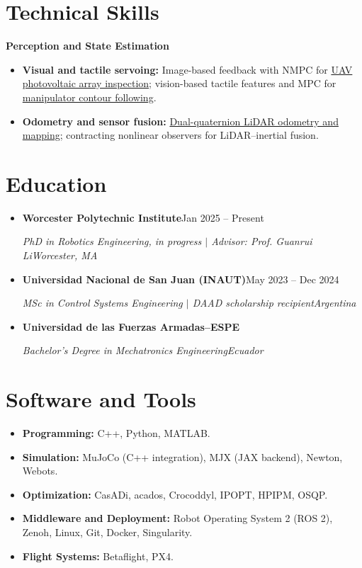 \documentclass[letterpaper,11pt]{article}
\newcommand{\resumeSubheading}[4]{
  \vspace{-2pt}\item
    \textbf{#1}\enspace\textbar\enspace #2\\
    {\small\textit{#3\enspace\textbar\enspace #4}\par}\vspace{-5pt}
}
\newcommand{\resumeSubHeadingListStart}{\begin{itemize}[leftmargin=0.15in, label={}, topsep=3pt]}
\newcommand{\resumeSubHeadingListEnd}{\end{itemize}}
\begin{document}
\section{Technical Skills}
{\small\textbf{Perception and State Estimation}\par}
\begin{itemize}[leftmargin=0.22in, itemsep=2pt, parsep=0pt, topsep=4pt]
\small
\item \textbf{Visual and tactile servoing:} Image-based feedback with NMPC for \href{https://doi.org/10.1109/LRA.2024.3360876}{UAV photovoltaic array inspection}; vision-based tactile features and MPC for \href{https://doi.org/10.1109/LRA.2026.3698362}{manipulator contour following}.
\item \textbf{Odometry and sensor fusion:} \href{https://doi.org/10.1016/j.robot.2025.105009}{Dual-quaternion LiDAR odometry and mapping}; contracting nonlinear observers for LiDAR--inertial fusion.
\end{itemize}

\section{Education}
\resumeSubHeadingListStart
\resumeSubheading{Worcester Polytechnic Institute}{Jan 2025 -- Present}
{PhD in Robotics Engineering, in progress $|$ Advisor: Prof. Guanrui Li}{Worcester, MA}
\resumeSubheading{Universidad Nacional de San Juan (INAUT)}{May 2023 -- Dec 2024}
{MSc in Control Systems Engineering $|$ DAAD scholarship recipient}{Argentina}
\resumeSubheading{Universidad de las Fuerzas Armadas--ESPE}{2021}
{Bachelor's Degree in Mechatronics Engineering}{Ecuador}
\resumeSubHeadingListEnd

\section{Software and Tools}
\begin{itemize}[leftmargin=0.15in, label={}, itemsep=2pt, parsep=0pt, topsep=3pt]
\small
\item \textbf{Programming:} C++, Python, MATLAB.
\item \textbf{Simulation:} MuJoCo (C++ integration), MJX (JAX backend), Newton, Webots.
\item \textbf{Optimization:} CasADi, acados, Crocoddyl, IPOPT, HPIPM, OSQP.
\item \textbf{Middleware and Deployment:} Robot Operating System 2 (ROS 2), Zenoh, Linux, Git, Docker, Singularity.
\item \textbf{Flight Systems:} Betaflight, PX4.
\end{itemize}
\end{document}
